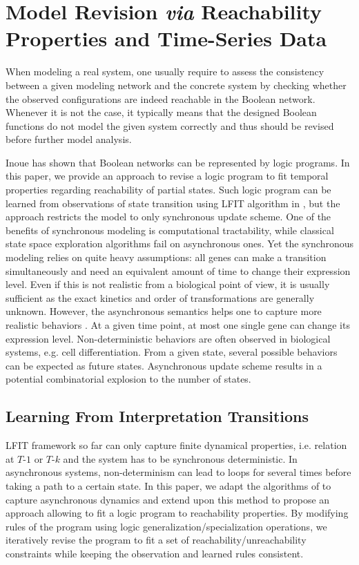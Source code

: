 \section{Model Revision \textit{via} Reachability Properties and Time-Series Data}
When modeling a real system, one usually require to assess the consistency between a given modeling network and the concrete system by checking whether the observed configurations are indeed reachable in the Boolean network.
Whenever it is not the case, it typically means that the designed Boolean functions do not model the given system correctly and thus should be revised before further model analysis.

Inoue \cite{inoue2011logic} has shown that Boolean networks can be represented by logic programs.
In this paper, we provide an approach to revise a logic program to fit temporal properties regarding reachability of partial states.
%
Such logic program can be learned from observations of state transition using LFIT algorithm in \cite{ribeiro2015learning}, but the approach restricts the model to only synchronous update scheme.
One of the benefits of synchronous modeling is computational tractability, while classical state space exploration algorithms fail on asynchronous ones.
Yet the synchronous modeling relies on quite heavy assumptions:
all genes can make a transition simultaneously and need an equivalent amount of time to change their expression level.
Even if this is not realistic from a biological point of view, it is usually sufficient as the exact kinetics and order of transformations are generally unknown.
However, the asynchronous semantics helps one to capture more realistic behaviors \cite{bernot2009}.
At a given time point, at most one single gene can change its expression level.
Non-deterministic behaviors are often observed in biological systems, e.g. cell differentiation.
From a given state, several possible behaviors can be expected as future states.
Asynchronous update scheme results in a potential combinatorial explosion to the number of states.


\subsection{Learning From Interpretation Transitions}\label{sec:lfit}
LFIT framework so far can only capture finite dynamical properties, i.e. relation at $T$-$1$ or $T$-$k$ and the system has to be synchronous deterministic.
In asynchronous systems, non-determinism can lead to loops for several times before taking a path to a certain state.
In this paper, we adapt the algorithms of \cite{ribeiro2015learning,DMTRICLP15} to capture asynchronous dynamics and extend upon this method to propose an approach allowing to fit a logic program to reachability properties.
By modifying rules of the program using logic generalization/specialization operations, we iteratively revise the program to fit a set of reachability/unreachability constraints while keeping the observation and learned rules consistent.

